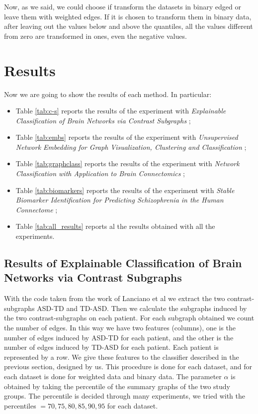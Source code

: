Now, as we said, we could choose if transform the datasets in binary edged or leave them with weighted edges. If it is chosen to transform them in binary data, after leaving out the values below and above the quantiles, all the values different from zero are transformed in ones, even the negative values.

\section{Results}
Now we are going to show the results of each method. In particular:
\vspace{0.5cm}
\begin{itemize}
	\item Table \ref{tab:c-s} reports the results of the experiment with \textit{Explainable Classification of Brain Networks via Contrast Subgraphs} \cite{lanciano2020cs};
	\item Table \ref{tab:embs} reports the results of the experiment with \textit{Unsupervised Network Embedding for Graph Visualization, Clustering and Classification} \cite{GutierrezUn};
	\item Table \ref{tab:graphclass} reports the results of the experiment with \textit{Network Classification with Application to Brain Connectomics} \cite{Arroyo_Reli_n_2019};
	\item Table \ref{tab:biomarkers} reports the results of the experiment with \textit{Stable Biomarker Identification for Predicting Schizophrenia in the Human Connectome} \cite{GutierrezBio};
	\item Table \ref{tab:all_results} reports al the results obtained with all the experiments.
\end{itemize}

\subsection{Results of Explainable Classification of Brain Networks via Contrast Subgraphs}

With the code taken from the work of Lanciano et al \cite{lanciano2020cs} we extract the two contrast-subgraphs ASD-TD and TD-ASD. Then we calculate the subgraphs induced by the two contrast-subgraphs on each patient. For each subgraph obtained we count the number of edges. In this way we have two features (columns), one is the number of edges induced by ASD-TD for each patient, and the other is the number of edges induced by TD-ASD for each patient.  Each patient is represented by a row. We give these features to the classifier described in the previous section, designed by us. This procedure is done for each dataset, and for each dataset is done for weighted data and binary data. The parameter $\alpha$ is obtained by taking the percentile of the summary graphs of the two study groups. The percentile is decided through many experiments, we tried with the percentiles $ = {70, 75, 80, 85, 90, 95}$ for each dataset.
\vspace{0.5cm}

